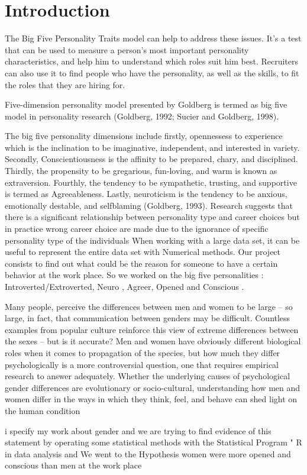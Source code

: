 \section{Introduction}

The Big Five Personality Traits model can help to address these issues. It's a test that can be used to measure a person's most important personality characteristics, and help him to understand which roles suit him best. Recruiters can also use it to find people who have the personality, as well as the skills, to fit the roles that they are hiring for.

Five-dimension personality model presented by Goldberg
is termed as big five model in personality research
(Goldberg, 1992; Sucier and Goldberg, 1998).

The big five personality dimensions include firstly, opennessess
to experience which is the inclination to be imaginative,
independent, and interested in variety. Secondly,
Conscientiousness is the affinity to be prepared, chary,
and disciplined. Thirdly, the propensity to be gregarious,
fun-loving, and warm is known as extraversion. Fourthly,
the tendency to be sympathetic, trusting, and supportive
is termed as Agreeableness. Lastly, neuroticism is the
tendency to be anxious, emotionally destable, and selfblaming (Goldberg, 1993). Research suggests that there is a significant relationship between personality type and career choices but in practice wrong career choice are made due to the ignorance of specific personality type of the individuals
When working with a large data set, it can be useful to represent the entire data set with Numerical methods. Our project consists to find out what could be the reason for someone to have a certain behavior  at the work place. So we worked on the big five personalities :  Introverted/Extroverted,  Neuro , Agreer, Opened  and Conscious .


Many people, perceive the differences between men and women to be large – so large, in fact, that communication between genders may be difficult. Countless examples from popular culture reinforce this view of extreme differences between the sexes – but is it accurate? Men and women have obviously different biological roles when it comes to propagation of the species, but how much they differ psychologically is a more controversial question, one that requires empirical research to answer adequately. Whether the underlying causes of psychological gender differences are evolutionary or socio-cultural, understanding how men and women differ in the ways in which they think, feel, and behave can shed light on the human condition

i specify my work about gender and we are trying to find evidence of this statement by operating some statistical methods with the Statistical Program " R in data analysis and We went to the Hypothesis women were more opened and conscious  than men at the work place
 
 
 

   


